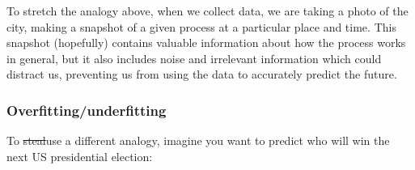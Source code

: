 \documentclass[]{article}
\begin{document}
To stretch the analogy above, when we collect data, we are taking a photo of the
city, making a snapshot of a given process at a particular place and time. This
snapshot (hopefully) contains valuable information about how the process works
in general, but it also includes noise and irrelevant information which could
distract us, preventing us from using the data to accurately predict the future.

\hypertarget{over-fitting}{%
\subsubsection*{Overfitting/underfitting}\label{over-fitting}}

To \sout{steal}use a different analogy, imagine you want to predict who will win
the next US presidential election:
\end{document}
